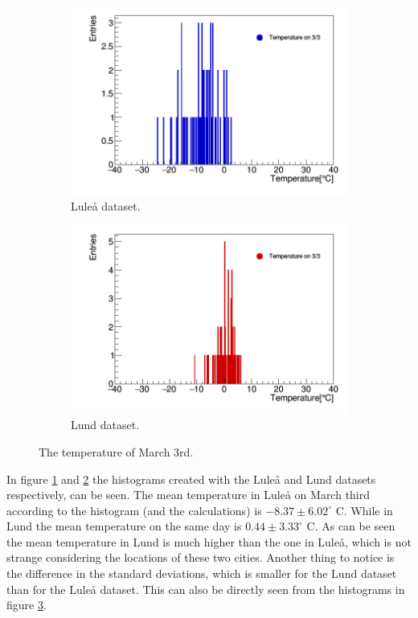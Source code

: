 \documentclass[../main.tex]{subfiles}
\begin{document}
\begin{figure}[!h]
\centering
\begin{subfigure}{.5\textwidth}
  \centering
  \includegraphics[width=1.0\linewidth]{../Lulea.png}
  \caption{Luleå dataset.}
  \label{fig:Lulea}
\end{subfigure}%
\begin{subfigure}{.5\textwidth}
  \centering
  \includegraphics[width=1.0\linewidth]{../Lund.png}
  \caption{Lund dataset.}
  \label{fig:Lund}
\end{subfigure}
\caption{The temperature of March 3rd.}
\label{fig:histos}
\end{figure}

\noindent In figure \ref{fig:Lulea} and \ref{fig:Lund} the histograms created with the Luleå and Lund datasets respectively, can be seen. The mean temperature in Luleå on March third according to the histogram (and the calculations) is $-8.37 \pm 6.02 ^\circ$ C. While in Lund the mean temperature on the same day is $0.44 \pm 3.33 ^\circ$ C. As can be seen the mean 
temperature in Lund is much higher than the one in Luleå, which is not strange considering the locations of these two cities. Another thing to notice is the difference in the standard deviations, which is smaller for the Lund dataset than for the Luleå dataset. This can also be directly seen from the histograms in figure \ref{fig:histos}. 
\end{document}
